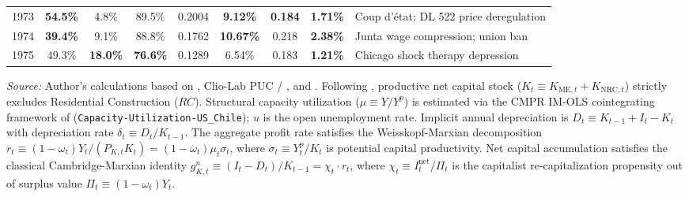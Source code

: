 \begin{table}[htbp]
{\begin{tabular}{lcccccccl}
1973 & \textbf{54.5\%} & 4.8\% & 89.5\% & 0.2004 & \textbf{9.12\%} & \textbf{0.184} & \textbf{1.71\%} & Coup d'état; DL 522 price deregulation \\
1974 & \textbf{39.4\%} & 9.1\% & 88.8\% & 0.1762 & \textbf{10.67\%} & 0.218 & \textbf{2.38\%} & Junta wage compression; union ban \\
1975 & 49.3\% & \textbf{18.0\%} & \textbf{76.6\%} & 0.1289 & 6.54\% & 0.183 & \textbf{1.21\%} & Chicago shock therapy depression \\
\bottomrule
\end{tabular}%
}
\begin{minipage}{0.96\textwidth}
\vspace{0.3em}
\footnotesize
\textit{Source:} Author's calculations based on \citet{Astorga2023}, Clio-Lab PUC / \citet{DiazLudersWagner2016}, and \citet{Polanco2026}. Following \citet{Polanco2026}, productive net capital stock ($K_t \equiv K_{\text{ME}, t} + K_{\text{NRC}, t}$) strictly excludes Residential Construction ($RC$). Structural capacity utilization ($\mu \equiv Y/Y^p$) is estimated via the CMPR IM-OLS cointegrating framework of \citet{Polanco2026} (\texttt{Capacity-Utilization-US\_Chile}); $u$ is the open unemployment rate. Implicit annual depreciation is $D_t \equiv K_{t-1} + I_t - K_t$ with depreciation rate $\delta_t \equiv D_t / K_{t-1}$. The aggregate profit rate satisfies the Weisskopf-Marxian decomposition $r_t \equiv (1 - \omega_t) Y_t / (P_{K, t} K_t) = (1 - \omega_t) \mu_t \sigma_t$, where $\sigma_t \equiv Y^p_t / K_t$ is potential capital productivity. Net capital accumulation satisfies the classical Cambridge-Marxian identity $g^n_{K, t} \equiv (I_t - D_t) / K_{t-1} = \chi_t \cdot r_t$, where $\chi_t \equiv I^{\text{net}}_t / \Pi_t$ is the capitalist re-capitalization propensity out of surplus value $\Pi_t \equiv (1 - \omega_t) Y_t$.
\end{minipage}
\end{table}
